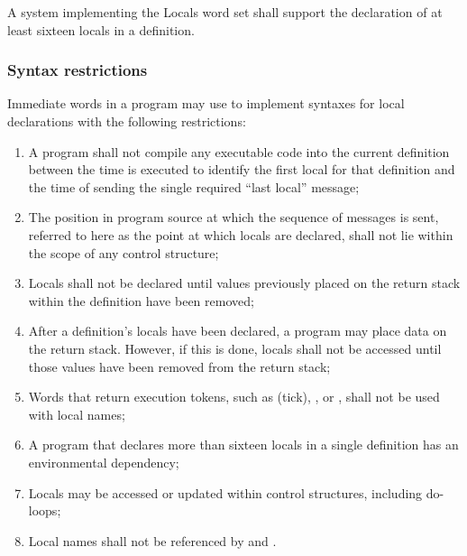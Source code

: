 A system implementing the Locals word set shall support the
declaration of at least sixteen locals in a definition.


\subsubsection{Syntax restrictions} %
\label{locals:rules}

Immediate words in a program may use  to implement
syntaxes for local declarations with the following restrictions:

\begin{enumerate}
\item A program shall not compile any executable code into the
	current definition between the time  is executed
	to identify the first local for that definition and the time of
	sending the single required ``last local'' message;

\item The position in program source at which the sequence of
	 messages is sent, referred to here as the point
	at which locals are declared, shall not lie within the scope of
	any control structure;

\item Locals shall not be declared until values previously placed on
	the return stack within the definition have been removed;

\item After a definition's locals have been declared, a program may
	place data on the return stack. However, if this is done,
	locals shall not be accessed until those values have been
	removed from the return stack;

\item Words that return execution tokens, such as 
	(tick), \word[core]{[']}, or , shall not be
	used with local names;

\item A program that declares more than sixteen locals in a single
	definition has an environmental dependency;

\item Locals may be accessed or updated within control structures,
	including do-loops;

\item Local names shall not be referenced by 
	and \word[core]{[COMPILE]}.
\end{enumerate}

